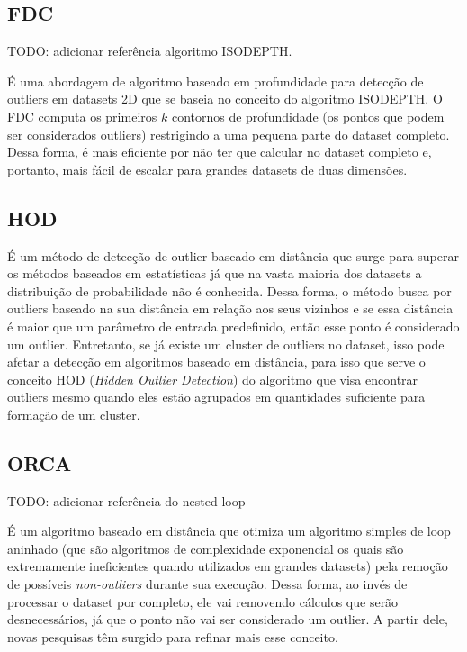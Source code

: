 \subsection{FDC}

TODO: adicionar referência algoritmo ISODEPTH.

É uma abordagem de algoritmo baseado em profundidade \cite{Johnson:1998:FCD:3000292.3000332} para detecção de outliers em datasets 2D que se baseia no conceito do algoritmo ISODEPTH. O FDC computa os primeiros $k$ contornos de profundidade (os pontos que podem ser considerados outliers) restrigindo a uma pequena parte do dataset completo. Dessa forma, é mais eficiente por não ter que calcular no dataset completo e, portanto, mais fácil de escalar para grandes datasets de duas dimensões.

\subsection{HOD}

É um método de detecção de outlier baseado em distância \cite{Xu2016} que surge para superar os métodos baseados em estatísticas já que na vasta maioria dos datasets a distribuição de probabilidade não é conhecida. Dessa forma, o método busca por outliers baseado na sua distância em relação aos seus vizinhos e se essa distância é maior que um parâmetro de entrada predefinido, então esse ponto é considerado um outlier. Entretanto, se já existe um cluster de outliers no dataset, isso pode afetar a detecção em algoritmos baseado em distância, para isso que serve o conceito HOD (\textit{Hidden Outlier Detection}) do algoritmo que visa encontrar outliers mesmo quando eles estão agrupados em quantidades suficiente para formação de um cluster.

\subsection{ORCA}
TODO: adicionar referência do nested loop

É um algoritmo baseado em distância \cite{Bay:2003:MDO:956750.956758} que otimiza um algoritmo simples de loop aninhado 
(que são algoritmos de complexidade exponencial os quais são extremamente ineficientes quando utilizados em grandes datasets) pela remoção de possíveis \textit{non-outliers} durante sua execução. Dessa forma, ao invés de processar o dataset por completo, ele vai removendo cálculos que serão desnecessários, já que o ponto não vai ser considerado um outlier. A partir dele, novas pesquisas têm surgido para refinar mais esse conceito. 

